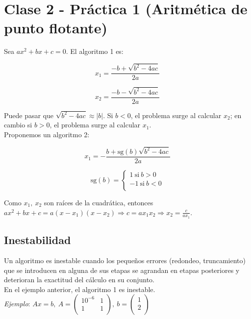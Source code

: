 \section{Clase 2 - Pr\'actica 1 (Aritm\'etica de punto flotante)}

Sea $ax^{2} + bx + c = 0$. El algoritmo 1 es:

$$x_{1} = \frac{-b + \sqrt{b^{2} - 4ac}}{2a}$$

$$x_{2} = \frac{-b - \sqrt{b^{2} - 4ac}}{2a}$$

Puede pasar que $\sqrt{b^{2} - 4ac} \approx |b|$. Si $b < 0$, el problema surge al calcular $x_{2}$; en cambio si $b > 0$, el problema surge al calcular $x_{1}$.\\

Proponemos un algoritmo 2:

$$x_{1} = -\frac{b + \text{sg}(b)\sqrt{b^{2} - 4ac}}{2a}$$

$$\text{sg}(b) = 
	\begin{cases}
        1\ \text{si}\ b > 0\\
        -1\ \text{si}\ b < 0\\
    \end{cases}
$$

Como $x_{1},\ x_{2}$ son ra\'ices de la cuadr\'atica, entonces $ax^{2} + bx + c = a(x - x_{1})(x - x_{2}) \Rightarrow c = ax_{1}x_{2} \Rightarrow x_{2} = \frac{c}{ax_{1}}$.\\

\subsection{Inestabilidad}

Un algoritmo es inestable cuando los peque\~nos errores (redondeo, truncamiento) que se introducen en alguna de sus etapas se agrandan en etapas posteriores y deterioran la exactitud del c\'alculo en su conjunto.\\

En el ejemplo anterior, el algoritmo 1 es inestable.\\

\textit{Ejemplo}: $Ax = b,\ A = \begin{pmatrix}
        10^{-6} & 1\\
        1 & 1\\
	\end{pmatrix},\ b = \begin{pmatrix}
        1\\
        2\\
	\end{pmatrix}$\\
	
